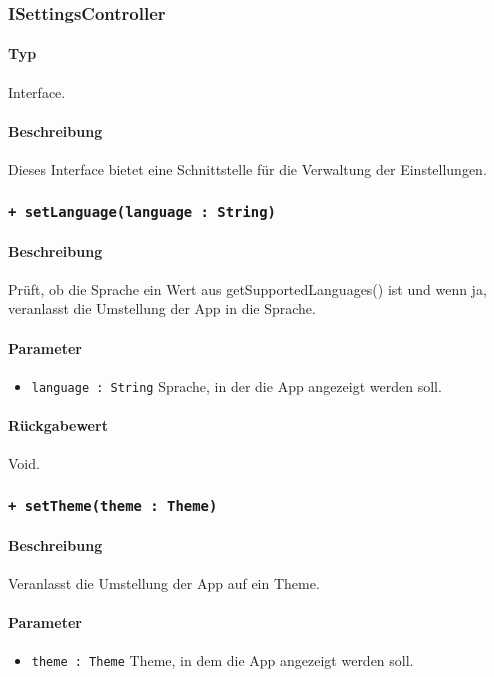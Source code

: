 \subsubsection{ISettingsController}
\paragraph*{Typ}
Interface.
\paragraph*{Beschreibung}
Dieses Interface bietet eine Schnittstelle für die Verwaltung der Einstellungen.

\subsubsection*{\texttt{+ setLanguage(language : String)}}%
\paragraph*{Beschreibung}
Prüft, ob die Sprache ein Wert aus getSupportedLanguages() ist und wenn ja, veranlasst die Umstellung der App in die Sprache.
\paragraph*{Parameter}
\begin{itemize}
    \item \texttt{language : String} Sprache, in der die App angezeigt werden soll.
\end{itemize}
\paragraph*{Rückgabewert}
Void.

\subsubsection*{\texttt{+ setTheme(theme : Theme)}}%
\paragraph*{Beschreibung}
Veranlasst die Umstellung der App auf ein Theme.
\paragraph*{Parameter}
\begin{itemize}
    \item \texttt{theme : Theme} Theme, in dem die App angezeigt werden soll.
\end{itemize}
